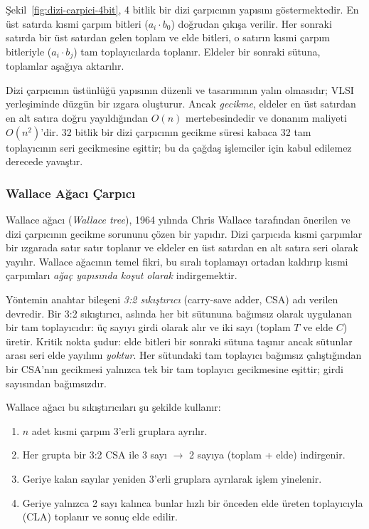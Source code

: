 Şekil~\ref{fig:dizi-carpici-4bit}, 4 bitlik bir dizi çarpıcının yapısını göstermektedir. En üst satırda kısmi çarpım bitleri ($a_i \cdot b_0$) doğrudan çıkışa verilir. Her sonraki satırda bir üst satırdan gelen toplam ve elde bitleri, o satırın kısmi çarpım bitleriyle ($a_i \cdot b_j$) tam toplayıcılarda toplanır. Eldeler bir sonraki sütuna, toplamlar aşağıya aktarılır.

Dizi çarpıcının üstünlüğü yapısının düzenli ve tasarımının yalın olmasıdır; VLSI yerleşiminde düzgün bir ızgara oluşturur. Ancak \emph{gecikme}, eldeler en üst satırdan en alt satıra doğru yayıldığından $O(n)$ mertebesindedir ve donanım maliyeti $O(n^2)$'dir. 32 bitlik bir dizi çarpıcının gecikme süresi kabaca 32 tam toplayıcının seri gecikmesine eşittir; bu da çağdaş işlemciler için kabul edilemez derecede yavaştır.

\subsubsection{Wallace Ağacı Çarpıcı}
\label{sec:wallace-agaci}

Wallace ağacı (\emph{Wallace tree}), 1964 yılında Chris Wallace tarafından önerilen ve dizi çarpıcının gecikme sorununu çözen bir yapıdır. Dizi çarpıcıda kısmi çarpımlar bir ızgarada satır satır toplanır ve eldeler en üst satırdan en alt satıra seri olarak yayılır. Wallace ağacının temel fikri, bu sıralı toplamayı ortadan kaldırıp kısmi çarpımları \emph{ağaç yapısında koşut olarak} indirgemektir.

Yöntemin anahtar bileşeni \emph{3:2 sıkıştırıcı} (carry-save adder, CSA) adı verilen devredir. Bir 3:2 sıkıştırıcı, aslında her bit sütununa bağımsız olarak uygulanan bir tam toplayıcıdır: üç sayıyı girdi olarak alır ve iki sayı (toplam $T$ ve elde $C$) üretir. Kritik nokta şudur: elde bitleri bir sonraki sütuna taşınır ancak sütunlar arası seri elde yayılımı \emph{yoktur}. Her sütundaki tam toplayıcı bağımsız çalıştığından bir CSA'nın gecikmesi yalnızca tek bir tam toplayıcı gecikmesine eşittir; girdi sayısından bağımsızdır.

Wallace ağacı bu sıkıştırıcıları şu şekilde kullanır:
\begin{enumerate}[nosep]
    \item $n$ adet kısmi çarpım 3'erli gruplara ayrılır.
    \item Her grupta bir 3:2 CSA ile 3 sayı $\to$ 2 sayıya (toplam + elde) indirgenir.
    \item Geriye kalan sayılar yeniden 3'erli gruplara ayrılarak işlem yinelenir.
    \item Geriye yalnızca 2 sayı kalınca bunlar hızlı bir önceden elde üreten toplayıcıyla (CLA) toplanır ve sonuç elde edilir.
\end{enumerate}

